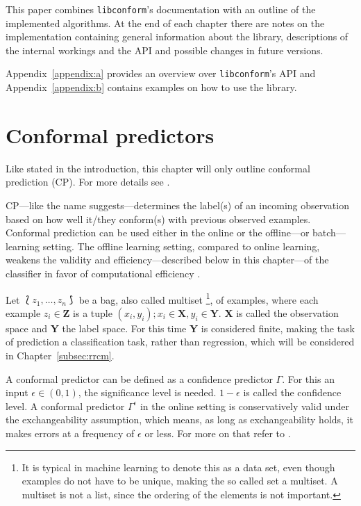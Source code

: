 \documentclass[twoside,11pt]{article}
\def\libconform{\texttt{libconform}}
\begin{document}
This paper combines \libconform{}'s documentation with an
outline of the implemented algorithms.
At the end of each chapter there are notes on the
implementation containing general information about the
library, descriptions of the internal workings and the API
and possible changes in future versions.

Appendix~\ref{appendix:a} provides an overview over
\libconform's API and Appendix~\ref{appendix:b} contains
examples on how to use the library.

\section{Conformal predictors}

Like stated in the introduction, this chapter will only
outline conformal prediction (CP). For more details see
\citet{alrw}.

CP---like the name suggests---determines the label(s) of an
incoming observation based on how well it/they conform(s)
with previous observed examples. Conformal prediction can
be used either in the online or the offline---or
batch---learning setting.
The offline learning setting, compared to online learning,
weakens the validity and efficiency---described below in
this chapter---of the classifier in favor of computational
efficiency \citep[see][Chapter 4]{alrw}.

Let $\Lbag z_1,\dots,z_n \Rbag$ be a bag, also called
multiset%
\footnote{It is typical in machine learning to denote this
as a data set, even though examples do not have to
be unique, making the so called set a multiset. A multiset
is not a list, since the ordering of the elements is not
important.},
of examples, where each example $z_i \in \textbf{Z}$ is a
tuple $(x_i,y_i); x_i \in \textbf{X}, y_i \in \textbf{Y}$.
\textbf{X} is called the observation space and \textbf{Y}
the label space. For this time \textbf{Y} is considered
finite, making the task of prediction a classification
task, rather than regression, which will be considered in
Chapter~\ref{subsec:rrcm}.

A conformal predictor can be defined as a confidence
predictor $\Gamma$. For this an input $\epsilon \in (0,1)$,
the significance level is needed. $1 - \epsilon$ is called
the confidence level.
A conformal predictor $\Gamma^\epsilon$ in the online
setting is conservatively valid under the exchangeability
assumption, which means, as long as exchangeability holds,
it makes errors at a frequency of $\epsilon$ or less. For
more on that refer to \citet[][Chapters 1--4, 7]{alrw}.
\end{document}
